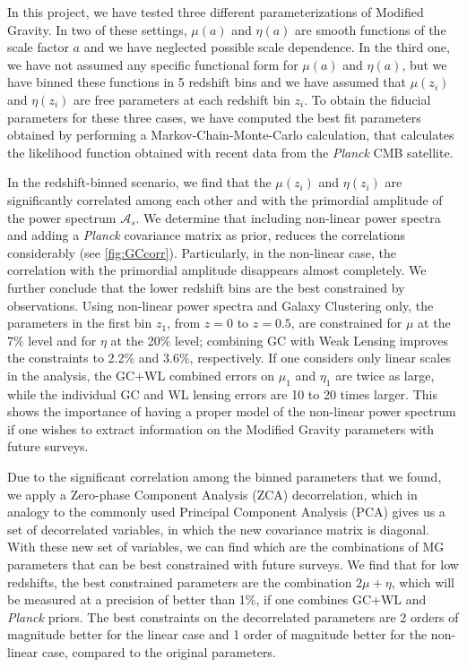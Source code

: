 In this project, we have tested three different parameterizations of Modified Gravity.
In two of these settings, $\mu(a)$ and $\eta(a)$  are smooth functions of the scale
factor $a$ and we have neglected possible scale dependence. In the third one, we have not assumed any specific functional form for $\mu(a)$ and $\eta(a)$,
but we have binned these functions in 5 redshift bins and we have assumed that $\mu(z_i)$ and $\eta(z_i)$ 
are free parameters at each redshift bin $z_i$.
To obtain the fiducial parameters for these three cases, we have computed the best fit parameters obtained by
performing a Markov-Chain-Monte-Carlo calculation, that calculates the likelihood function obtained with recent data from the \textit{Planck} CMB satellite.

In the redshift-binned scenario, we find that the $\mu(z_i)$ and $\eta(z_i)$ are significantly correlated among each other and
with the primordial amplitude of the power spectrum $\mathcal{A}_s$. We determine that including non-linear power spectra and adding
a \textit{Planck} covariance matrix as prior, reduces the correlations considerably (see \cref{fig:GCcorr}). 
Particularly, in the non-linear case, the correlation
with the primordial amplitude disappears almost completely. We further conclude that the lower redshift bins are the best constrained
by observations. 
Using non-linear power spectra and Galaxy Clustering only,
the parameters in the first bin $z_1$, from $z=0$ to $z=0.5$, are constrained for $\mu$ at the 
7\% level and for $\eta$ at the 20\% level; combining GC with Weak Lensing improves the constraints 
to 2.2\% and 3.6\%, respectively. If one considers only linear scales in the analysis,
the GC+WL combined errors on $\mu_1$ and $\eta_1$ are twice as large, while the individual GC
and WL lensing errors are 10 to 20 times larger.
This shows the importance of having a proper model of the non-linear power spectrum if one wishes to extract information
on the Modified Gravity parameters with future surveys. 

Due to the significant correlation among the binned parameters that we found, we apply a Zero-phase Component Analysis (ZCA) decorrelation, which in analogy to the commonly used
Principal Component Analysis (PCA) gives us a set of decorrelated variables, in which the new covariance matrix is diagonal.
With these new set of variables, we can find which are the combinations of MG parameters that can be best constrained with future surveys.
We find that for low redshifts, the best constrained parameters are the combination $2\mu + \eta$, which will be measured at a precision of better
than 1\%, if one combines GC+WL and \textit{Planck} priors. The best constraints on the decorrelated parameters are 2 orders of magnitude better
for the linear case and 1 order of magnitude better for the non-linear case, compared to the original parameters.

